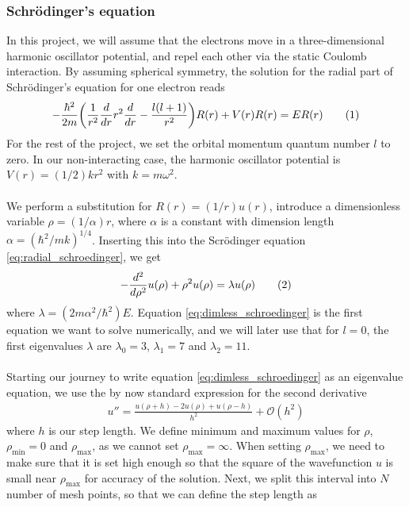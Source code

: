 \documentclass{article}
\newcommand\numberthis{\addtocounter{equation}{1}\tag{\theequation}}
\begin{document}
\subsubsection{Schrödinger's equation}
In this project, we will assume that the electrons move in a three-dimensional harmonic oscillator potential, and repel each other via the static Coulomb interaction. By assuming spherical symmetry, the solution for the radial part of Schrödinger's equation for one electron reads
\begin{align*}
  -\frac{\hbar^2}{2m}\bigg(\frac{1}{r^2}\frac{d}{dr}r^2\frac{d}{dr} - \frac{l(l+1)}{r^2}\bigg)R(r) + V(r)R(r) = ER(r)\numberthis\label{eq:radial_schroedinger}
\end{align*}
For the rest of the project, we set the orbital momentum quantum number $l$ to zero. In our non-interacting case, the harmonic oscillator potential is $V(r) = (1/2)kr^2$ with $k=m\omega^2$.\\\\We perform a substitution for $R(r) = (1/r)u(r)$, introduce a dimensionless variable $\rho = (1/\alpha)r$, where $\alpha$ is a constant with dimension length $\alpha = (\hbar^2/mk)^{1/4}$. Inserting this into the Scrödinger equation \eqref{eq:radial_schroedinger}, we get
\begin{align*}
-\frac{d^2}{d\rho^2}u(\rho) + \rho^2u(\rho) = \lambda u(\rho)\numberthis\label{eq:dimless_schroedinger}
\end{align*}
where $\lambda = (2m\alpha^2/\hbar^2)E$. Equation \eqref{eq:dimless_schroedinger} is the first equation we want to solve numerically, and we will later use that for $l=0$, the first eigenvalues $\lambda$ are $\lambda_0 = 3$, $\lambda_1 = 7$ and $\lambda_2 = 11$.\\\\
Starting our journey to write equation \eqref{eq:dimless_schroedinger} as an eigenvalue equation, we use the by now standard expression for the second derivative
\begin{align*}
  u'' = \frac{u(\rho+h)-2u(\rho)+u(\rho-h)}{h^2}+\mathcal{O}(h^2)
\end{align*}
where $h$ is our step length. We define minimum and maximum values for $\rho$, $\rho_{\text{min}} = 0$ and $\rho_{\text{max}}$, as we cannot set $\rho_{\text{max}} = \infty$. When setting $\rho_{\text{max}}$, we need to make sure that it is set high enough so that the square of the wavefunction $u$ is small near $\rho_{\text{max}}$ for accuracy of the solution. Next, we split this interval into $N$ number of mesh points, so that we can define the step length as
\end{document}
